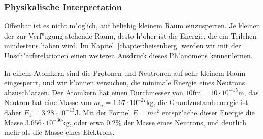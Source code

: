 \subsubsection{Physikalische Interpretation}
Offenbar ist es nicht m"oglich, auf beliebig kleinem Raum einzusperren.
Je kleiner der zur Verf"ugung stehende Raum, desto h"oher ist die
Energie, die ein Teilchen mindestens haben wird.
Im Kapitel~\ref{chapter:heisenberg} werden wir mit der Unsch"arferelationen
einen weiteren Ausdruck dieses Ph"anomens kennenlernen.

In einem Atomkern sind die Protonen und Neutronen auf sehr kleinem
Raum eingesperrt, und wir k"onnen versuchen, die minimale Energie 
eines Neutrons abzusch"atzen.
Der Atomkern hat einen Durchmesser von $10\text{fm}=10\cdot 10^{-15}\text{m}$,
das Neutron hat eine Masse von $m_n=1.67\cdot 10^{-27}\text{kg}$,
die Grundzustandsenergie ist daher $E_1=3.28\cdot10^{-13}\text{J}$.
Mit der Formel $E=mc^2$ entspr"ache dieser Energie die Masse
$3.656\cdot 10^{-30}\text{kg}$, oder etwa $0.2\%$ der Masse eines
Neutrons, und deutlich mehr als die Masse eines Elektrons.

